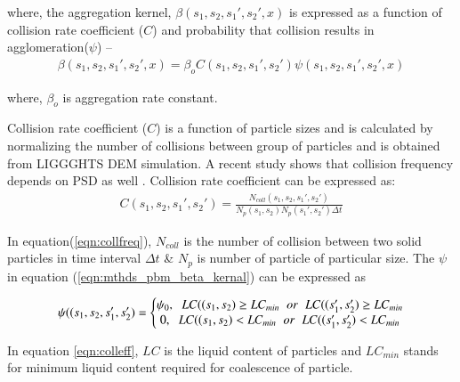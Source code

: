 \documentclass[preprint,11pt,authoryear]{elsarticle}
\begin{document}
\par where, the aggregation kernel, $\beta(s_1,s_2, s_1',s_2',x)$ is expressed as a function of collision rate coefficient ($C$) and probability that collision results in agglomeration($\psi$) \citep{ingram2005} –
\begin{align}
\beta(s_1,s_2,s_1',s_2',x) = \beta_oC(s_1,s_2,s_1',s_2')\psi(s_1,s_2,s_1',s_2',x)
\label{eqn:mthds_pbm_beta_kernal}
\end{align}

where, $\beta_o$ is aggregation rate constant.
\par Collision rate coefficient ($C$) is a function of particle sizes and is calculated by normalizing the number of collisions between group of particles \citep{gantt2006} and is obtained from LIGGGHTS DEM simulation. A recent study shows that collision frequency depends on PSD as well \citep{sen2014}. Collision rate coefficient can be expressed as:
\begin{align}
C(s_1,s_2,s_1',s_2')=\frac{N_{coll}(s_1,s_2,s_1',s_2')}{N_p(s_1,s_2)N_p(s_1',s_2')\Delta t}
\label{eqn:collfreq}
\end{align}
\par In equation(\ref{eqn:collfreq}), $N_{coll}$ is the number of collision between two solid particles in time interval $\Delta t$ \& $N_p$ is number of particle of particular size. The $\psi$ in equation (\ref{eqn:mthds_pbm_beta_kernal}) can be expressed as 

\begin{align}
\psi((s_1,s_2,s_1',s_2') = 
\left\{\begin{matrix}
\psi_0,\hspace{0.2cm} LC((s_1,s_2) \geq LC_{min}\hspace{0.2cm} or\hspace{0.2cm} LC((s_1',s_2') \geq LC_{min}	\\ 
0,\hspace{0.2cm} LC((s_1,s_2) < LC_{min}\hspace{0.2cm} or\hspace{0.2cm} LC((s_1',s_2') < LC_{min}
\end{matrix}\right.
\label{eqn:colleff}
\end{align}
\par In equation \ref{eqn:colleff}, $LC$ is the liquid content of particles and $LC_{min}$ stands for minimum liquid content required for coalescence of particle. 
\end{document}
